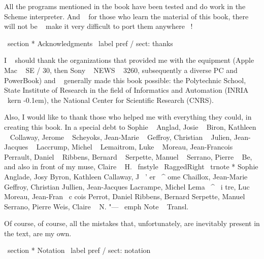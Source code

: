 All the programs mentioned in the book have been tested and do work
in the Scheme interpreter. And ~ for those who learn the material of this book, there will not be ~
make it very difficult to port them anywhere ~!


\ section * {Acknowledgments} \ label {pref / sect: thanks}

I ~ should thank the organizations that provided me with the equipment
(Apple ~ Mac ~ SE / 30, then Sony ~ NEWS ~ 3260, subsequently a diverse PC and
PowerBook) and ~ generally made this book possible: the Polytechnic School,
State Institute of Research in the field of Informatics and Automation
(INRIA \ kern -0.1em), the National Center for Scientific Research (CNRS).

Also, I would like to thank those who helped me with everything they could, in creating
this book. In a special debt to Sophie ~ Anglad, Josie ~ Biron, Kathleen ~ Collaway,
Jerome ~ Scheyoks, Jean-Marie ~ Geffroy, Christian ~ Julien, Jean-Jacques ~ Laccrump,
Michel ~ Lemaitrom, Luke ~ Moreau, Jean-Francois ~ Perrault, Daniel ~ Ribbens,
Bernard ~ Serpette, Manuel ~ Serrano, Pierre ~ Be, and also in front of my muse,
Claire ~ H. { \ fnstyle { \ RaggedRight } \ trnote * {Sophie Anglade, Josy Byron, Kathleen
Callaway, J \ ' er \ ^ ome Chaillox, Jean-Marie Geffroy, Christian Jullien,
Jean-Jacques Lacrampe, Michel Lema { \ ^ \ i } tre, Luc Moreau, Jean-Fran \ c cois
Perrot, Daniel Ribbens, Bernard Serpette, Manuel Serrano, Pierre Weis,
Claire ~ N. "--- \ emph {Note ~ Transl.}}}

Of course, of course, all the mistakes that, unfortunately, are inevitably present in the text,
are my own.


\ section * {Notation} \ label {pref / sect: notation}

